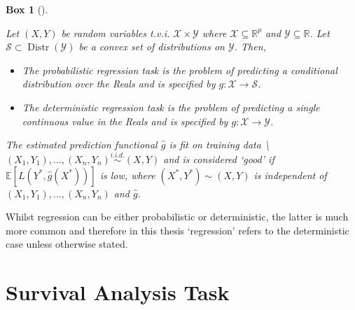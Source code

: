 \documentclass[
  letterpaper,
]{scrbook}
\providecommand{\tightlist}{%
  \setlength{\itemsep}{0pt}\setlength{\parskip}{0pt}}\usepackage{longtable,booktabs,array}
\theoremstyle{plain}
\newtheorem{conjecture}{Box}[chapter]
\theoremstyle{definition}
\theoremstyle{remark}
\begin{document}
\begin{tcolorbox}[enhanced jigsaw, titlerule=0mm, bottomrule=.15mm, left=2mm, leftrule=.75mm, rightrule=.15mm, colbacktitle=quarto-callout-note-color!10!white, bottomtitle=1mm, opacitybacktitle=0.6, title={Regression Task}, breakable, arc=.35mm, coltitle=black, toprule=.15mm, colframe=quarto-callout-note-color-frame, opacityback=0, toptitle=1mm, colback=white]

\leavevmode{}%
\begin{conjecture}[]\label{cnj-task-regr}

Let \((X,Y)\) be random variables t.v.i.
\(\mathcal{X}\times \mathcal{Y}\) where
\(\mathcal{X}\subseteq \mathbb{R}^p\) and
\(\mathcal{Y}\subseteq \mathbb{R}\). Let
\(\mathcal{S}\subset \operatorname{Distr}(\mathcal{Y})\) be a convex set
of distributions on \(\mathcal{Y}\). Then,

\begin{itemize}
\tightlist
\item
  The \emph{probabilistic regression task} is the problem of predicting
  a conditional distribution over the Reals and is specified by
  \(g : \mathcal{X}\rightarrow \mathcal{S}\).
\item
  The \emph{deterministic regression task} is the problem of predicting
  a single continuous value in the Reals and is specified by
  \(g: \mathcal{X}\rightarrow \mathcal{Y}\).
\end{itemize}

The estimated prediction functional \(\hat{g}\) is fit on training data
\textbackslash{}\((X_1,Y_1),...,(X_n,Y_n) \stackrel{i.i.d.}\sim(X,Y)\)
and is considered `good' if \(\mathbb{E}[L(Y^*, \hat{g}(X^*))]\) is low,
where \((X^*, Y^*) \sim (X, Y)\) is independent of
\((X_1,Y_1),...,(X_n,Y_n)\) and \(\hat{g}\).

\end{conjecture}

\end{tcolorbox}

Whilst regression can be either probabilistic or deterministic, the
latter is much more common and therefore in this thesis `regression'
refers to the deterministic case unless otherwise stated.

\section{Survival Analysis Task}
\label{sec:surv_setmltask}
\end{document}
